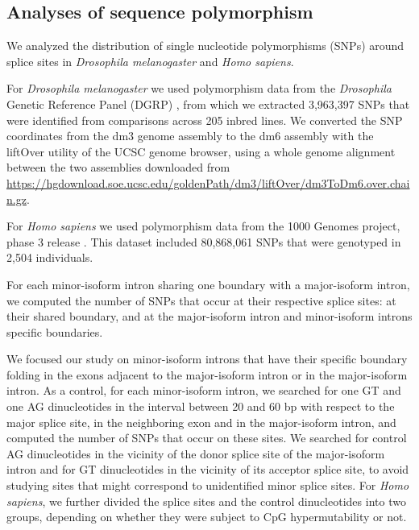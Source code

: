 \subsection{Analyses of sequence polymorphism}
We analyzed the distribution of single nucleotide polymorphisms (SNPs) around splice sites in \textit{Drosophila melanogaster} and \textit{Homo sapiens}.

For \textit{Drosophila melanogaster} we used polymorphism data from the \textit{Drosophila} Genetic Reference Panel (DGRP) \citep{huang_natural_2014, mackay_drosophila_2012}, from which we extracted 3,963,397 SNPs that were identified from comparisons across 205 inbred lines. We converted the SNP coordinates from the dm3 genome assembly to the dm6 assembly with the liftOver utility \citep{hinrichs_ucsc_2006} of the UCSC genome browser, using a whole genome alignment between the two assemblies downloaded from \url{https://hgdownload.soe.ucsc.edu/goldenPath/dm3/liftOver/dm3ToDm6.over.chain.gz}. 

For \textit{Homo sapiens} we used polymorphism data from the 1000 Genomes project, phase 3 release \citep{auton_global_2015}. This dataset included 80,868,061 SNPs that were genotyped in 2,504 individuals.

For each minor-isoform intron sharing one boundary with a major-isoform intron, we computed the number of SNPs that occur at their respective splice sites: at their shared boundary, and at the major-isoform intron and minor-isoform introns specific boundaries. 

We focused our study on minor-isoform introns that have their specific boundary folding in the exons adjacent to the major-isoform intron or in the major-isoform intron. As a control, for each minor-isoform intron, we searched for one GT and one AG dinucleotides in the interval between 20 and 60 bp with respect to the major splice site, in the neighboring exon and in the major-isoform intron, and computed the number of SNPs that occur on these sites. We searched for control AG dinucleotides in the vicinity of the donor splice site of the major-isoform intron and for GT dinucleotides in the vicinity of its acceptor splice site, to avoid studying sites that might correspond to unidentified minor splice sites. For \textit{Homo sapiens}, we further divided the splice sites and the control dinucleotides into two groups, depending on whether they were subject to \gls{CpG} hypermutability or not. 

